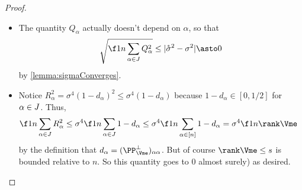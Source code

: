 \documentclass[main.tex]{subfiles}
\begin{document}
\begin{proof}
\begin{itemize}
\begin{align*}
                C \times 0 \times \mathcal{E} = 0
        \end{align*}
        where $\mathcal{E}$ is the Gaussian expectation that $\f 1 n \sum_{\alpha \in [n]} \lp
                    \sum_{i=1}^r (\xme_\alpha^i)^2
                    + \sum_{j=1}^s (\vme_\alpha^j)^2
                    \rp$ converges a.s. to, by inductive hypothesis.
    \item
        The quantity $Q_\alpha$ actually doesn't depend on $\alpha$, so that
        \[\sqrt{\f 1 n \sum_{\alpha \in \JJc} Q_\alpha^2} \le |\mathring \sigma^2 - \sigma^2| \asto 0\]
        by \cref{lemma:sigmaConverges}.
    \item
        Notice $R_\alpha^2 = \sigma^4 (1 - d_\alpha)^2 \le \sigma^4 (1 - d_\alpha)$ because $1 - d_\alpha \in [0, 1/2]$ for $\alpha \in J$.
        Thus,
        \begin{align*}
        \f 1 n \sum_{\alpha \in \JJc} R_\alpha^2
            &\le
                \sigma^4 \f 1 n \sum_{\alpha \in \JJc} 1 - d_\alpha
            \le 
                \sigma^4 \f 1 n \sum_{\alpha \in [n]} 1 - d_\alpha
            =
                \sigma^4 \f 1 n \rank \Vme
        \end{align*}
        by the definition that $d_\alpha = (\PP^\perp_{\Vme})_{\alpha\alpha}$.
        But of course $\rank \Vme \le s$ is bounded relative to $n$.
        So this quantity goes to 0 almost surely) as desired.
    \end{itemize}
\end{proof}
\end{document}
